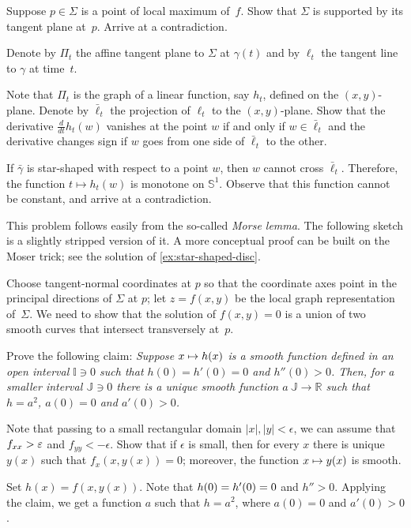 \begin{multicols}{2}
 Suppose $p\in \Sigma$ is a point of local maximum of~$f$.
Show that $\Sigma$ is supported by its tangent plane at~$p$.
Arrive at a contradiction.


Denote by $\Pi_t$ the affine tangent plane to $\Sigma$ at $\gamma(t)$ and by $\ell_t$ the tangent line to $\gamma$ at time~$t$.

Note that $\Pi_t$ is the graph of a linear function, say $h_t$, defined on the $(x, y)$-plane.
Denote by $\bar\ell_t$ the projection of $\ell_t$ to the $(x, y)$-plane.
Show that the derivative $\tfrac{d}{dt}h_t(w)$ vanishes at the point $w$ if and only if $w\in \bar\ell_t$ 
and the derivative changes sign if $w$ goes from one side of $\bar\ell_t$ to the other.

If $\bar\gamma$ is star-shaped with respect to a point $w$, then $w$ cannot cross $\bar\ell_t$.
Therefore, the function $t\mapsto h_t(w)$ is monotone on $\mathbb{S}^1$.
Observe that this function cannot be constant, and arrive at a contradiction.

This problem follows easily from the so-called \emph{Morse lemma}.
The following sketch is a slightly stripped version of it.
A more conceptual proof \cite{palais} can be built on the Moser trick; see the solution of \ref{ex:star-shaped-disc}.

\medskip

Choose tangent-normal coordinates at $p$ so that the coordinate axes point in the principal directions of $\Sigma$ at $p$;
let $z=f(x,y)$ be the local graph representation of~$\Sigma$.
We need to show that the solution of $f(x,y)=0$ is a union of two smooth curves that intersect transversely at~$p$.

Prove the following claim:
\textit{Suppose $x\z\mapsto h(x)$ is a smooth function defined in an open interval $\mathbb{I}\ni0$ such that $h(0)=h'(0)=0$ and $h''(0)>0$.
Then, for a smaller interval $\mathbb{J}\ni0$ there is a unique smooth function $a\:\mathbb{J}\to\mathbb{R}$ such that $h=a^2$, $a(0)=0$ and $a'(0)> 0$.}

Note that passing to a small rectangular domain $|x|,|y|<\epsilon$, we can assume that $f_{xx}\z>\epsilon$ and $f_{yy}<-\epsilon$. 
Show that if $\epsilon$ is small, then for every $x$ there is unique $y(x)$ such that $f_x(x,y(x))=0$; 
moreover, the function $x\z\mapsto y(x)$ is smooth.

Set $h(x)=f(x,y(x))$.
Note that $h(0)\z=h'(0)=0$ and $h''>0$.
Applying the claim, we get a function $a$ such that $h=a^2$, where $a(0)=0$ and $a'(0)>0$.


\end{multicols}

